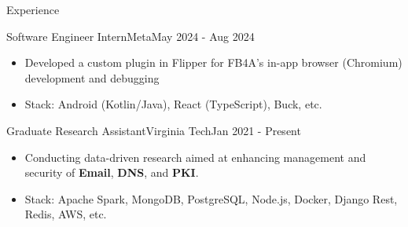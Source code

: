 \documentclass[]{mcdowellcv}
\begin{document}
	\begin{cvsection}{Experience}
		\begin{cvsubsection}{Software Engineer Intern}{Meta}{May 2024 - Aug 2024}
			\begin{itemize}
				\item Developed a custom plugin in Flipper for FB4A's in-app browser (Chromium) development and debugging
				\item Stack: Android (Kotlin/Java), React (TypeScript), Buck, etc.
			\end{itemize}
		\end{cvsubsection}
		\begin{cvsubsection}{Graduate Research Assistant}{Virginia Tech}{Jan 2021 - Present}
			\begin{itemize}
				\item Conducting data-driven research aimed at enhancing management and security of \textbf{Email}, \textbf{DNS}, and \textbf{PKI}.
				\item Stack: Apache Spark, MongoDB, PostgreSQL, Node.js, Docker, Django Rest, Redis, AWS, etc.
			\end{itemize}
		\end{cvsubsection}


\end{cvsection}
\end{document}
